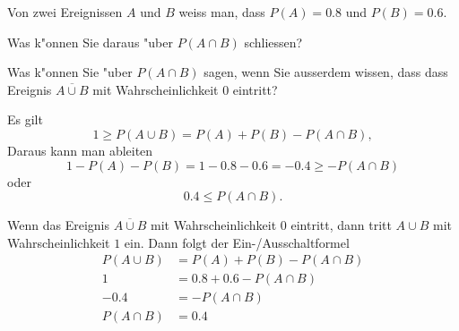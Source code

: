 Von zwei Ereignissen $A$ und $B$ weiss man, dass $P(A)=0.8$ und $P(B)=0.6$.
\begin{teilaufgaben}
\item
Was k"onnen Sie daraus "uber $P(A\cap B)$ schliessen?
\item
Was k"onnen Sie "uber $P(A\cap B)$ sagen, wenn Sie ausserdem wissen, dass 
dass Ereignis $\overline{A\cup B}$ mit Wahrscheinlichkeit $0$ eintritt?
\end{teilaufgaben}

\begin{loesung}
\begin{teilaufgaben}
\item 
Es gilt
\[
1\ge P(A\cup B)=P(A)+P(B)-P(A\cap B),
\]
Daraus kann man ableiten
\[
1-P(A)-P(B)=1-0.8-0.6=-0.4 \ge -P(A\cap B)
\]
oder
\[
0.4\le P(A\cap B).
\]
\item 
Wenn das Ereignis $\overline{A\cup B}$ mit Wahrscheinlichkeit $0$ eintritt,
dann tritt $A\cup B$ mit Wahrscheinlichkeit $1$ ein.
Dann folgt der Ein-/Ausschaltformel
\begin{align*}
P(A\cup B)&=P(A)+P(B)-P(A\cap B)\\
1&=0.8+0.6-P(A\cap B)\\
-0.4&=-P(A\cap B)\\
P(A\cap B)&=0.4
\end{align*}
\end{teilaufgaben}
\end{loesung}

